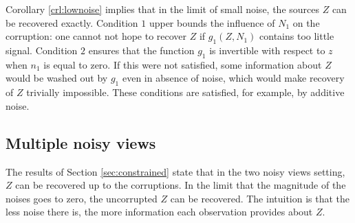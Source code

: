 %	

Corollary \ref{crl:lownoise} implies that in the limit of small noise, the sources $Z$ can be recovered exactly.
Condition $1$ upper bounds the influence of $N_1$ on the corruption: one cannot not hope to recover $Z$ if $g_1(Z, N_1)$ contains too little signal.
Condition $2$ ensures that the function $g_1$ is invertible with respect to $z$ when $n_1$ is equal to zero.
If this were not satisfied, some information about $Z$ would be washed out by $g_1$ even in absence of noise, which would make recovery of $Z$ trivially impossible.
These conditions are satisfied, for example, by additive noise.


\subsection{Multiple noisy views}
\label{sec:multiple}

The results of Section \ref{sec:constrained} state that in the two noisy views setting, $Z$ can be recovered up to the corruptions.
In the limit that the magnitude of the noises goes to zero, the uncorrupted $Z$ can be recovered.
The intuition is that the less noise there is, the more information each observation provides about $Z$.

